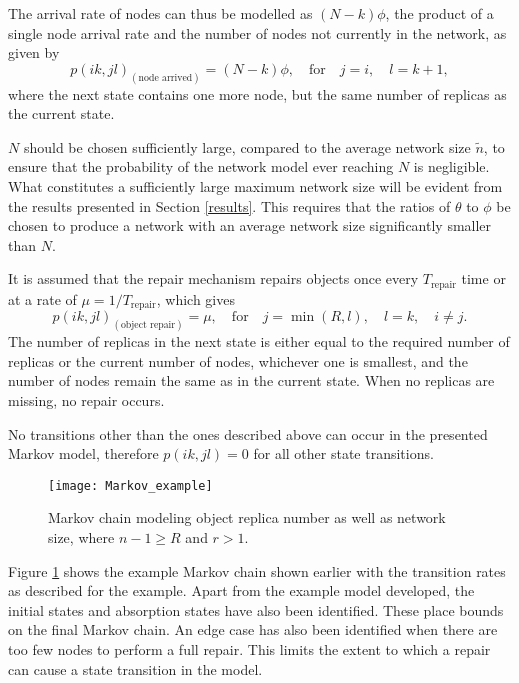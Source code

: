 The arrival rate of nodes can thus be modelled as $(N - k)\phi$, the product of a single node arrival rate and the number of nodes not currently in the network, as given by
%
\begin{equation} \label{eq_node_arrived}
    p(i k,j l)_{(\textrm{node arrived})} = (N - k)\phi,\quad\textrm{for}\quad j = i,\quad l = k + 1,
\end{equation}
%
where the next state contains one more node, but the same number of replicas as the current state.


$N$ should be chosen sufficiently large, compared to the average network size $\tilde{n}$, to ensure that the probability of the network model ever reaching $N$ is negligible. What constitutes a sufficiently large maximum network size will be evident from the results presented in Section \ref{results}. This requires that the ratios of $\theta$ to $\phi$ be chosen to produce a network with an average network size significantly smaller than $N$.

It is assumed that the repair mechanism repairs objects once every $T_{\textrm{repair}}$ time or at a rate of $\mu = 1/T_{\textrm{repair}}$, which gives
%
\begin{equation} \label{eq_repair}
    p(i k,j l)_{(\textrm{object repair})} = \mu,\quad\textrm{for}\quad j = \min(R, l),\quad l = k,\quad i \neq j.
\end{equation}
%
The number of replicas in the next state is either equal to the required number of replicas or the current number of nodes, whichever one is smallest, and the number of nodes remain the same as in the current state. When no replicas are missing, no repair occurs.

No transitions other than the ones described above can occur in the presented Markov model, therefore $p(i k,j l) = 0$ for all other state transitions.

\begin{figure}[htbp]
 \centering
 \texttt{[image: Markov\_example]}
 \caption{Markov chain modeling object replica number as well as network size, where $n-1\geqslant R$ and $r > 1$.}
 \label{fig_markov_example}
\end{figure}
%
Figure \ref{fig_markov_example} shows the example Markov chain shown earlier with the transition rates as described for the example. Apart from the example model developed, the initial states and absorption states have also been identified. These place bounds on the final Markov chain. An edge case has also been identified when there are too few nodes to perform a full repair. This limits the extent to which a repair can cause a state transition in the model.

